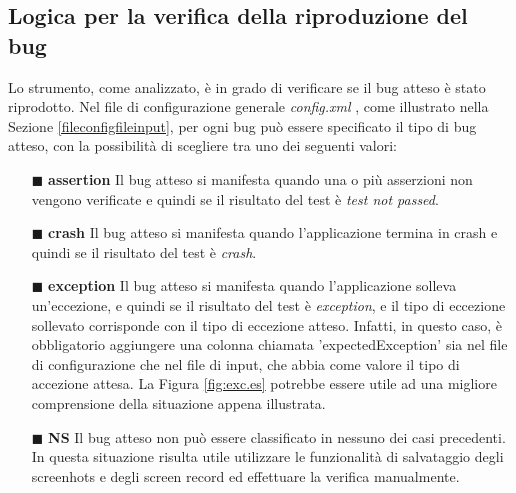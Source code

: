 \subsection*{Logica per la verifica della riproduzione del bug} \label{valbugatt}
Lo strumento, come analizzato, è in grado di verificare se il bug atteso è stato riprodotto. Nel file di configurazione generale \emph{config.xml} , come illustrato nella Sezione \ref{fileconfigfileinput}, per ogni bug può essere specificato il tipo di bug atteso, con la possibilità di scegliere tra uno dei seguenti valori:
\begin{itemize} [nosep]
\item [$\blacksquare$] \textbf{assertion} \newline
Il bug atteso si manifesta quando una o più asserzioni non vengono verificate e quindi se il risultato del test è \emph{test not passed}.
\item  [$\blacksquare$] \textbf{crash} \newline
Il bug atteso si manifesta quando l'applicazione termina in crash e quindi se il risultato del test è \emph{crash}.
\item  [$\blacksquare$] \textbf{exception} \newline
Il bug atteso si manifesta quando l'applicazione solleva un'eccezione, e quindi se il risultato del test è \emph{exception}, e il tipo di eccezione sollevato corrisponde con il tipo di eccezione atteso. Infatti, in questo caso, è obbligatorio aggiungere una colonna chiamata 'expectedException' sia nel file di configurazione che nel file di input, che abbia come valore il tipo di accezione attesa. La Figura \ref{fig:exc.es} potrebbe essere utile ad una migliore comprensione della situazione appena illustrata.
\item [$\blacksquare$]  \textbf{NS} \newline
Il bug atteso non può essere classificato in nessuno dei casi precedenti. In questa situazione risulta utile utilizzare le funzionalità di salvataggio degli screenhots e degli screen record ed effettuare la verifica manualmente.
\end{itemize}

